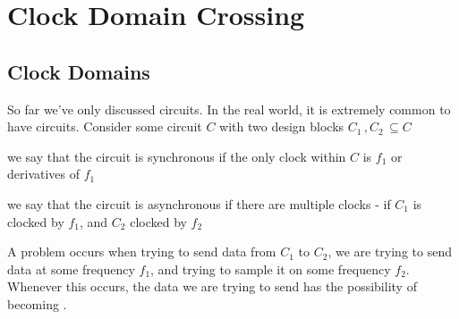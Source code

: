 \chapter{Clock Domain Crossing}

\section{Clock Domains}

So far we've only discussed  circuits. In the real world, it is extremely common to have  circuits. Consider some circuit $C$ with two design blocks $C_1\,,C_2\,\subseteq C$
\begin{bullets}
	\item we say that the circuit is synchronous if the only clock within $C$ is $f_1$ or derivatives of $f_1$
	\item we say that the circuit is asynchronous if there are multiple clocks - if $C_1$ is clocked by $f_1$, and $C_2$ clocked by $f_2$
\end{bullets}

A problem occurs when trying to send data from $C_1$ to $C_2$, we are trying to send data at some frequency $f_1$, and trying to sample it on some frequency $f_2$. Whenever this occurs, the data we are trying to send has the possibility of becoming .